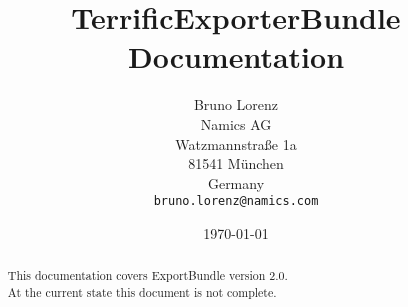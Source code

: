 \documentclass{article}
\title{TerrificExporterBundle Documentation}
\author{Bruno Lorenz\\
  Namics AG\\
  Watzmannstraße 1a\\
  81541 München\\
  Germany\\
  \texttt{bruno.lorenz@namics.com}}
\date{\today}
\begin{document}
\begin{abstract}
    \Large This documentation covers ExportBundle version 2.0.\\
    \Large At the current state this document is not complete.
\end{abstract}

\newpage
\tableofcontents










\end{document}
